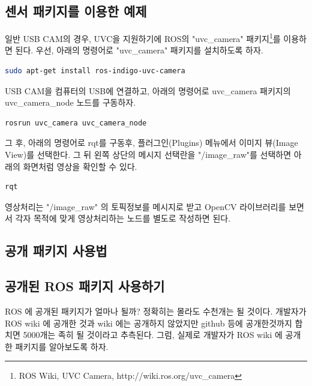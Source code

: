\subsection{센서 패키지를 이용한 예제}

일반 USB CAM의 경우, UVC을 지원하기에 ROS의 "uvc\_camera" 패키지\footnote{ROS Wiki, UVC Camera, http://wiki.ros.org/uvc\_camera}를 이용하면 된다. 우선, 아래의 명령어로 "uvc\_camera" 패키지를 설치하도록 하자.

\begin{lstlisting}[language=bash]
sudo apt-get install ros-indigo-uvc-camera 
\end{lstlisting}

USB CAM을 컴퓨터의 USB에 연결하고, 아래의 명령어로 uvc\_camera 패키지의 uvc\_camera\_node 노드를 구동하자.

\begin{lstlisting}[language=bash]
rosrun uvc_camera uvc_camera_node
\end{lstlisting}

그 후, 아래의 명령어로 rqt를 구동후, 플러그인(Plugins) 메뉴에서 이미지 뷰(Image View)를 선택한다. 그 뒤 왼쪽 상단의 메시지 선택란을 "/image\_raw"를 선택하면 아래의 화면처럼 영상을 확인할 수 있다. 

\begin{lstlisting}[language=bash]
rqt
\end{lstlisting}

영상처리는 "/image\_raw" 의 토픽정보를 메시지로 받고 OpenCV 라이브러리를 보면서 각자 목적에 맞게 영상처리하는 노드를 별도로 작성하면 된다.

\subsection{공개 패키지 사용법}

\subsection{공개된 ROS 패키지 사용하기}

ROS 에 공개된 패키지가 얼마나 될까? 정확히는 몰라도 수천개는 될 것이다. 개발자가 ROS wiki 에 공개한 것과 wiki 에는 공개하지 않았지만 github 등에 공개한것까지 합치면 5000개는 족히 될 것이라고 추측된다. 그럼, 실제로 개발자가 ROS wiki 에 공개한 패키지를 알아보도록 하자.

